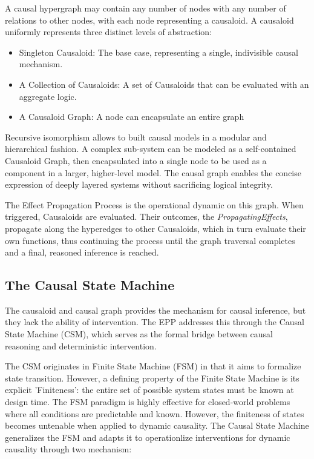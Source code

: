A causal hypergraph may contain any number of nodes with any number of relations to other nodes, with each node representing a causaloid. A causaloid uniformly represents three distinct levels of abstraction:

\begin{itemize}
    \item Singleton Causaloid: The base case, representing a single, indivisible causal mechanism.
    \item A Collection of Causaloids: A set of Causaloids that can be evaluated with an aggregate logic.
    \item A Causaloid Graph: A node can encapsulate an entire graph
\end{itemize}

Recursive isomorphism allows to built causal models in a modular and hierarchical fashion.
A complex sub-system can be modeled as a self-contained Causaloid Graph, then encapsulated into a single node to be used as a component in a larger, higher-level model. The causal graph enables the concise expression of deeply layered systems without sacrificing logical integrity.

The Effect Propagation Process is the operational dynamic on this graph. When triggered, Causaloids are evaluated. Their outcomes, the \textit{PropagatingEffects}, propagate along the hyperedges to other Causaloids, which in turn evaluate their own functions, thus continuing the process until the graph traversal completes and a final, reasoned inference is reached.

\subsection{The Causal State Machine}
\label{sec:epp_csm}

The causaloid and causal graph provides the mechanism for causal inference,
but they lack the ability of intervention. The EPP addresses this through the Causal State Machine (CSM), which serves as the formal bridge between causal reasoning and deterministic intervention.

The CSM originates in Finite State Machine (FSM) in that it aims to formalize state transition.
However, a defining property of the Finite State Machine is its explicit 'Finiteness': the entire set of possible system states must be known at design time. The FSM paradigm is highly effective for closed-world problems where all conditions are predictable and known. However, the finiteness of states becomes untenable when applied to dynamic causality. The Causal State Machine generalizes the FSM and adapts it
to operationlize interventions for dynamic causality through two mechanism:

